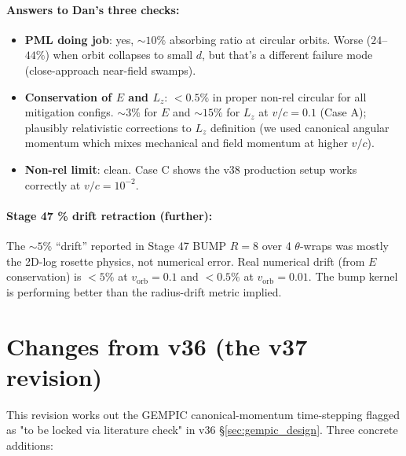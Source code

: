 \documentclass[11pt,a4paper]{article}
\begin{document}
\paragraph{Answers to Dan's three checks:}
\begin{itemize}
  \item \textbf{PML doing job}: yes, $\sim 10\%$ absorbing ratio at
    circular orbits.  Worse ($24$--$44\%$) when orbit collapses to
    small $d$, but that's a different failure mode (close-approach
    near-field swamps).
  \item \textbf{Conservation of $E$ and $L_z$}: $<\!0.5\%$ in proper
    non-rel circular for all mitigation configs.  $\sim 3\%$ for $E$
    and $\sim 15\%$ for $L_z$ at $v/c = 0.1$ (Case A); plausibly
    relativistic corrections to $L_z$ definition (we used canonical
    angular momentum which mixes mechanical and field momentum at
    higher $v/c$).
  \item \textbf{Non-rel limit}: clean.  Case C shows the v38
    production setup works correctly at $v/c = 10^{-2}$.
\end{itemize}

\paragraph{Stage 47 \% drift retraction (further):}
The $\sim 5\%$ ``drift'' reported in Stage 47 BUMP $R=8$ over 4
$\theta$-wraps was mostly the 2D-log rosette physics, not
numerical error.  Real numerical drift (from $E$ conservation) is
$<\!5\%$ at $v_{\mathrm{orb}} = 0.1$ and $<\!0.5\%$ at
$v_{\mathrm{orb}} = 0.01$.  The bump kernel is performing better
than the radius-drift metric implied.

\newpage

\section*{Changes from v36 (the v37 revision)}

This revision works out the GEMPIC canonical-momentum time-stepping
flagged as "to be locked via literature check" in v36
§\ref{sec:gempic_design}.  Three concrete additions:
\end{document}
